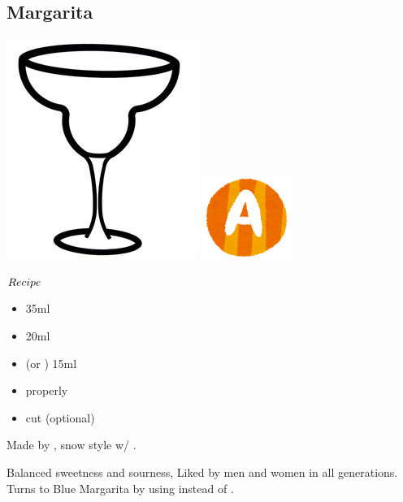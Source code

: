 \subsection{Margarita}
\vspace{-7mm}
\hspace{33mm}
\includegraphics[scale=.05]{cocktail_glass_snow.jpg}
\includegraphics[scale=.12]{capital_a.png}
\vspace{2.5mm}
\begin{itembox}[l]{\boldmath $Recipe$}
\begin{itemize}
\setlength{\parskip}{0cm}
\setlength{\itemsep}{0cm}
\item \teq 35ml
\item \wc 20ml
\item \limj (or \lj) 15ml
\item \salt properly
\item \lime cut (optional)
\end{itemize}
\vspace{-4mm}
Made by \shake
\hspace{-1mm}, snow style w/ \salt
\hspace{-1mm}.
\end{itembox}
Balanced sweetness and sourness, Liked by men and women in all generations.
Turns to Blue Margarita by using \bc instead of \wc
\hspace{-1mm}.
